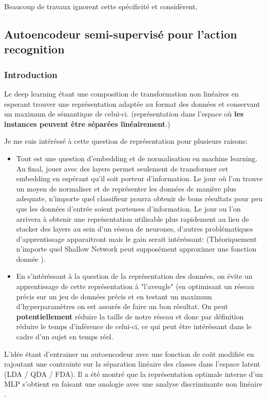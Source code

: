 Beaucoup de travaux ignorent cette spécificité et considèrent, 



\subsection{Autoencodeur semi-supervisé pour l'action recognition}

\subsubsection{Introduction}
Le deep learning étant une composition de transformation non linéaires en esperant trouver une représentation adaptée au format des données et conservant un maximum de sémantique de celui-ci. (représentation dans l'espace où \textbf{les instances peuvent être séparées linéairement}.)

Je me suis intéréssé à cette question de représentation pour plusieurs raisons:
\begin{itemize}
    \item Tout est une question d'embedding et de normalisation en machine learning. Au final, jouer avec des layers permet seulement de transformer cet embedding en espérant qu'il soit porteur d'information. Le jour où l'on trouve un moyen de normaliser et de représenter les données de manière plus adequate, n'importe quel classifieur pourra obtenir de bons résultats pour peu que les données d'entrée soient porteuses d'information. Le jour ou l'on arrivera à obtenir une représentation utilisable plus rapidement au lieu de stacker des layers au sein d'un réseau de neurones, d'autres problématiques d'apprentissage apparaitront mais le gain serait intéréssant: (Théoriquement n'importe quel Shallow Network peut supposément approximer une fonction donnée \cite{2016arXiv160803287M}).
    
    \item En s'intéréssant à la question de la représentation des données, on évite un apprentissage de cette représentation à "l'aveugle" (en optimisant un réseau précis sur un jeu de données précis et en testant un maximum d'hyperparamètres on est assurés de faire un bon résultat.  On peut \textbf{potentiellement} réduire la taille de notre réseau et donc par définition réduire le temps d'inférence de celui-ci, ce qui peut être intéréssant dans le cadre d'un sujet en temps réel.
\end{itemize}

L'idée étant d'entrainer un autoencodeur avec une fonction de coût modifiée en rajoutant une contrainte sur la séparation linéaire des classes dans l'espace latent (LDA / QDA / FDA). Il a été montré que la représentation optimale interne d'un MLP s'obtient en faisant une analogie avec une analyse discriminante non linéaire \cite{webb1990optimised}.

